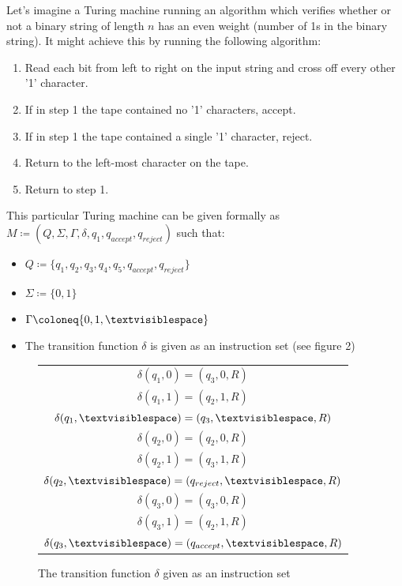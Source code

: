 \documentclass{article}
\begin{document}
\begin{exmp}
Let's imagine a Turing machine running an algorithm which verifies whether or not a binary string of length $n$ has an even weight (number of 1s in the binary string).  It might achieve this by running the following algorithm:
\begin{enumerate}
	\item Read each bit from left to right on the input string and cross off every other '1' character.
	\item If in step 1 the tape contained no '1' characters, accept.
	\item If in step 1 the tape contained a single '1' character, reject.
	\item Return to the left-most character on the tape.
	\item Return to step 1.
\end{enumerate}
\noindent This particular Turing machine can be given formally as $M \coloneq (Q, \Sigma, \Gamma, \delta, q_{1}, q_{accept}, q_{reject})$ such that:
\begin{itemize}
	\item $Q \coloneq \{ q_{1}, q_{2}, q_{3}, q_{4}, q_{5}, q_{accept}, q_{reject} \}$
	\item $\Sigma \coloneq \{ 0, 1 \}$
	\item $\Gamma \coloneq \{ 0, 1, \textvisiblespace \}$
	\item The transition function $\delta$ is given as an instruction set (see figure 2)
\end{itemize}
\begin{figure}[h]
	\begin{tabular}{ c }
	$\delta(q_{1}, 0) = (q_{3}, 0, R)$ \\
	$\delta(q_{1}, 1) = (q_{2}, 1, R)$ \\
	$\delta(q_{1}, \textvisiblespace) = (q_{3}, \textvisiblespace, R)$ \\
	$\delta(q_{2}, 0) = (q_{2}, 0, R)$ \\
	$\delta(q_{2}, 1) = (q_{3}, 1, R)$ \\
	$\delta(q_{2}, \textvisiblespace) = (q_{reject}, \textvisiblespace, R)$ \\
	$\delta(q_{3}, 0) = (q_{3}, 0, R)$ \\
	$\delta(q_{3}, 1) = (q_{2}, 1, R)$ \\
	$\delta(q_{3}, \textvisiblespace) = (q_{accept}, \textvisiblespace, R)$
	\end{tabular}
	\centering
	\caption{The transition function $\delta$ given as an instruction set}

\end{figure}
\end{exmp}
\end{document}
